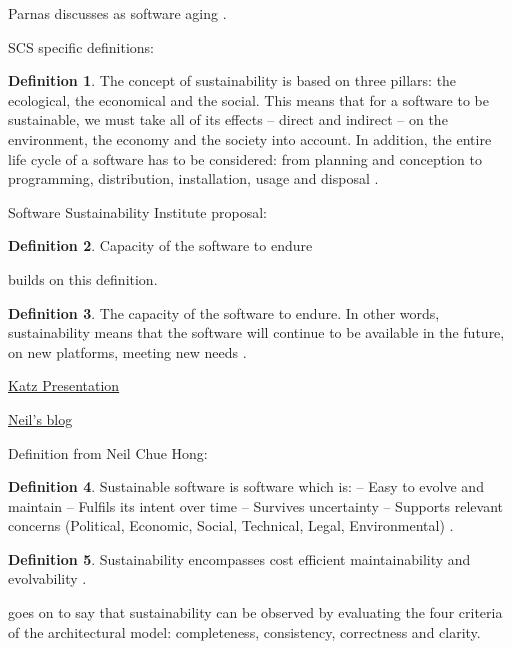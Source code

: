 \documentclass[letterpaper,cleveref]{lipics-v2019}
\theoremstyle{definition}
\newtheorem{defn}{Definition}
\begin{document}
Parnas discusses as software aging \citep{Parnas1994a}.

SCS specific definitions:

\begin{defn}
  The concept of sustainability is based on three pillars: the ecological, the
  economical and the social. This means that for a software to be sustainable,
  we must take all of its effects -- direct and indirect -- on the environment,
  the economy and the society into account. In addition, the entire life cycle
  of a software has to be considered: from planning and conception to
  programming, distribution, installation, usage and disposal \citep{Heine2017}.
\end{defn}

Software Sustainability Institute proposal:

\begin{defn}
Capacity of the software to endure
\end{defn}

\citet{Katz2016} builds on this definition.

\begin{defn}
  \noindent The capacity of the software to endure. In other words,
  sustainability means that the software will continue to be available in the
  future, on new platforms, meeting new needs \citep{Katz2016}.
\end{defn}

\href{https://collegeville.github.io/CW3S19/WorkshopResources/Presentations/4-5-Katz_data-driven-software-sustainability.pdf}
{Katz Presentation}

\href{https://www.software.ac.uk/blog/2019-09-12-making-open-source-research-software-visible-path-better-sustainability}
{Neil's blog}

Definition from Neil Chue Hong:
\begin{defn}
	Sustainable software is software which is:
	-- Easy to evolve and maintain
	-- Fulfils its intent over time
	-- Survives uncertainty
	-- Supports relevant concerns (Political, Economic, Social, Technical,
	Legal, Environmental) \citep{Katz2016}.
\end{defn}

\begin{defn}
Sustainability encompasses cost efficient maintainability and evolvability \citep{SehestedtEtAl2014}.
\end{defn}

\citet{SehestedtEtAl2014} goes on to say that sustainability can be observed by
evaluating the four criteria of the architectural model: completeness,
consistency, correctness and clarity.
\end{document}
